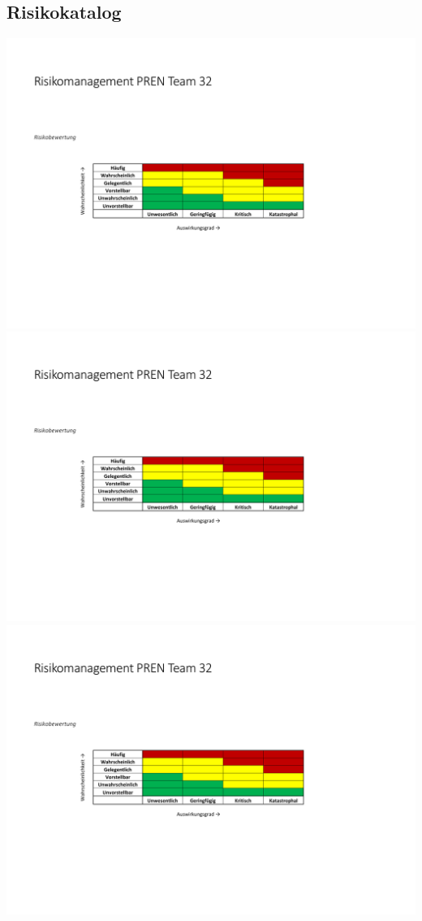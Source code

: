 \documentclass[a4paper,10pt,fleqn]{article} %
\begin{document}
\begin{appendix}
\begin{landscape}
   			\section{Risikokatalog}
   			\includegraphics[page=1,scale=0.73,clip,trim=17mm 27mm 31mm 39mm]{Anhang/Risikomanagement.pdf}
   			\newpage  			
   			\includegraphics[page=2,scale=1,clip,trim=20mm 22mm 21mm 32mm]{Anhang/Risikomanagement.pdf}
   			\newpage  			
   			\includegraphics[page=3,scale=1,clip,trim=20mm 22mm 21mm 22mm]{Anhang/Risikomanagement.pdf}

\end{landscape}
\end{appendix}
\end{document}
